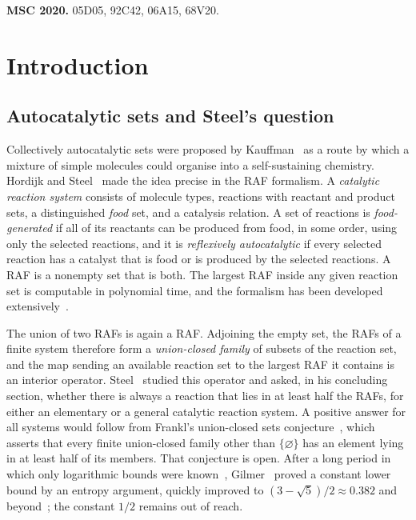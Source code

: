 \documentclass[11pt,a4paper]{article}
\theoremstyle{plain}
\theoremstyle{definition}
\theoremstyle{remark}
\begin{document}
\noindent\textbf{MSC 2020.} 05D05, 92C42, 06A15, 68V20.

\section{Introduction}\label{sec:intro}

\subsection{Autocatalytic sets and Steel's question}

Collectively autocatalytic sets were proposed by Kauffman~\cite{kauffman1986autocatalytic,kauffman1993origins} as a route by which a mixture of simple molecules could organise into a self-sustaining chemistry. Hordijk and Steel~\cite{hordijk2004detecting} made the idea precise in the RAF formalism. A \emph{catalytic reaction system} consists of molecule types, reactions with reactant and product sets, a distinguished \emph{food} set, and a catalysis relation. A set of reactions is \emph{food-generated} if all of its reactants can be produced from food, in some order, using only the selected reactions, and it is \emph{reflexively autocatalytic} if every selected reaction has a catalyst that is food or is produced by the selected reactions. A RAF is a nonempty set that is both. The largest RAF inside any given reaction set is computable in polynomial time, and the formalism has been developed extensively~\cite{steel2013minimal,hordijk2017chasing,steel2019autocatalytic,mossel2005random}.

The union of two RAFs is again a RAF. Adjoining the empty set, the RAFs of a finite system therefore form a \emph{union-closed family} of subsets of the reaction set, and the map sending an available reaction set to the largest RAF it contains is an interior operator. Steel~\cite{steel2023interior} studied this operator and asked, in his concluding section, whether there is always a reaction that lies in at least half the RAFs, for either an elementary or a general catalytic reaction system. A positive answer for all systems would follow from Frankl's union-closed sets conjecture~\cite{frankl1995extremal,bruhn2015journey}, which asserts that every finite union-closed family other than $\{\varnothing\}$ has an element lying in at least half of its members. That conjecture is open. After a long period in which only logarithmic bounds were known~\cite{wojcik1999union}, Gilmer~\cite{gilmer2022constant} proved a constant lower bound by an entropy argument, quickly improved to $(3-\sqrt5)/2\approx0.382$ and beyond~\cite{alweiss2022improved,chase2022approximate,sawin2022improved,cambie2022better}; the constant $1/2$ remains out of reach.
\end{document}
